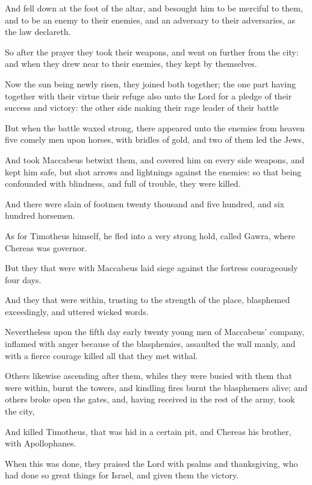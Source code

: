 {\par }{\PP {}And fell down at the foot of the altar, and besought him to be merciful to them, and to be an enemy to their enemies, and an adversary to their adversaries, as the law declareth.
\par }{\PP {}So after the prayer they took their weapons, and went on further from the city: and when they drew near to their enemies, they kept by themselves.
\par }{\PP {}Now the sun being newly risen, they joined both together; the one part having together with their virtue their refuge also unto the Lord for a pledge of their success and victory: the other side making their rage leader of their battle
\par }{\PP {}But when the battle waxed strong, there appeared unto the enemies from heaven five comely men upon horses, with bridles of gold, and two of them led the Jews,
\par }{\PP {}And took Maccabeus betwixt them, and covered him on every side weapons, and kept him safe, but shot arrows and lightnings against the enemies: so that being confounded with blindness, and full of trouble, they were killed.
\par }{\PP {}And there were slain of footmen twenty thousand and five hundred, and six hundred horsemen.
\par }{\PP {}As for Timotheus himself, he fled into a very strong hold, called Gawra, where Chereas was governor.
\par }{\PP {}But they that were with Maccabeus laid siege against the fortress courageously four days.
\par }{\PP {}And they that were within, trusting to the strength of the place, blasphemed exceedingly, and uttered wicked words.
\par }{\PP {}Nevertheless upon the fifth day early twenty young men of Maccabeus’ company, inflamed with anger because of the blasphemies, assaulted the wall manly, and with a fierce courage killed all that they met withal.
\par }{\PP {}Others likewise ascending after them, whiles they were busied with them that were within, burnt the towers, and kindling fires burnt the blasphemers alive; and others broke open the gates, and, having received in the rest of the army, took the city,
\par }{\PP {}And killed Timotheus, that was hid in a certain pit, and Chereas his brother, with Apollophanes.
\par }{\PP {}When this was done, they praised the Lord with psalms and thanksgiving, who had done so great things for Israel, and given them the victory.

}

